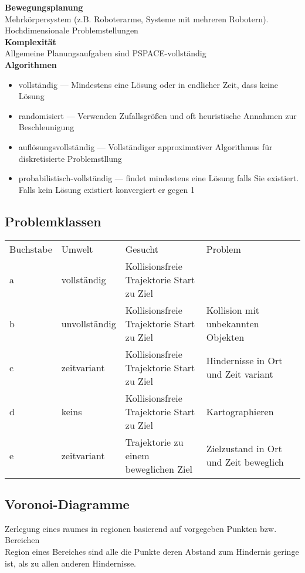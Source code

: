 \textbf{Bewegungsplanung}\\
Mehrkörpersystem (z.B. Roboterarme, Systeme mit mehreren Robotern).\\
Hochdimensionale Problemstellungen\\

\textbf{Komplexität}\\
Allgemeine Planungsaufgaben sind PSPACE-vollständig\\

\newpage
\textbf{Algorithmen}\\
\begin{itemize}
\item vollständig --- Mindestens eine Lösung oder in endlicher Zeit, dass keine Lösung
\item randomisiert --- Verwenden Zufallsgrößen und oft heuristische Annahmen zur Beschleunigung
\item auflösungsvollständig --- Vollständiger approximativer Algorithmus für diskretisierte Problemstllung
\item probabilistisch-vollständig --- findet mindestens eine Lösung falls Sie existiert. Falls kein Lösung existiert
  konvergiert er gegen 1
\end{itemize}

\subsection{Problemklassen}
\begin{tabular}{lllll}
  Buchstabe & Umwelt & Gesucht & Problem\\
  a & vollständig &  Kollisionsfreie Trajektorie Start zu Ziel & \\
  b & unvollständig & Kollisionsfreie Trajektorie Start zu Ziel & Kollision mit unbekannten Objekten\\
  c & zeitvariant &  Kollisionsfreie Trajektorie Start zu Ziel & Hindernisse in Ort und Zeit variant\\
  d & keins &  Kollisionsfreie Trajektorie Start zu Ziel & Kartographieren\\
  e & zeitvariant &  Trajektorie zu einem beweglichen Ziel & Zielzustand in Ort und Zeit beweglich\\
\end{tabular}

\subsection{Voronoi-Diagramme}
Zerlegung eines raumes in regionen basierend auf vorgegeben Punkten bzw. Bereichen\\
Region eines Bereiches sind alle die Punkte deren Abstand zum Hindernis geringe ist, als zu allen anderen Hindernisse.\\

